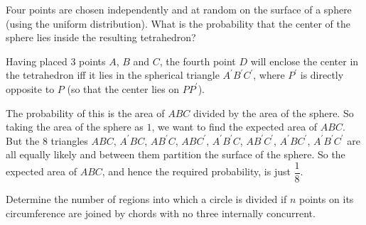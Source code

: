 \begin{prbm}
Four points are chosen independently and at random on the surface of a sphere (using the uniform distribution). What is the probability that the center of the sphere lies inside the resulting tetrahedron?
\end{prbm}

\begin{solution}
Having placed $3$ points $A$, $B$ and $C$, the fourth point $D$ will enclose the center in the tetrahedron iff it lies in the spherical triangle $A^\prime B^\prime C^\prime $, where $P^\prime $ is directly opposite to $P$ (so that the center lies on $PP^\prime$).

The probability of this is the area of $ABC$ divided by the area of the sphere. So taking the area of the sphere as $1$, we want to find the expected area of $ABC$. But the $8$ triangles $ABC$, $A^\prime BC$, $AB^\prime C$, $ABC^\prime$, $A^\prime B^\prime C$, $AB^\prime C^\prime$, $A^\prime BC^\prime$, $A^\prime B^\prime C^\prime$ are all equally likely and between them partition the surface of the sphere. So the expected area of $ABC$, and hence the required probability, is just $\boxed{\dfrac{1}{8}}$.
\end{solution}
\pagebreak

\begin{prbm}
Determine the number of regions into which a circle is divided if $n$ points on its circumference are joined by chords with no three internally concurrent.
\end{prbm}

